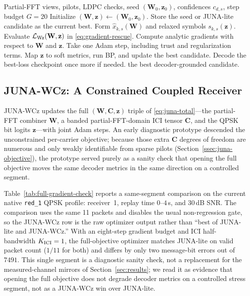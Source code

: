 \documentclass[journal]{IEEEtran}
\newcommand{\junalite}{JUNA-lite}
\newcommand{\junawz}{JUNA-Wz}
\newcommand{\junawcz}{JUNA-WCz}
\begin{document}
\begin{algorithm}[t]
\caption{\junawz{} robust reduced-gradient refinement}
\label{alg:junawz}
\footnotesize
\begin{algorithmic}[1]
\Require Partial-FFT views, pilots, LDPC checks, seed
  \((\mathbf W_0,\mathbf z_0)\), confidences \(c_{d,s}\), step budget \(G=20\)
\State Initialize \((\mathbf W,\mathbf z)\gets(\mathbf W_0,\mathbf z_0)\).
\State Store the seed or \junalite{} candidate as the current best.
  \State Form \(\widehat x_{k,s}(\mathbf W)\) and relaxed symbols
    \(s_{k,s}(\mathbf z)\).
  \State Evaluate \(\mathcal L_{\rm Wz}(\mathbf W,\mathbf z)\) in
    \eqref{eq:gradient-rescue}.
  \State Compute analytic gradients with respect to \(\mathbf W\) and
    \(\mathbf z\).
  \State Take one Adam step, including trust and regularization terms.
  \State Map \(\mathbf z\) to soft metrics, run BP, and update the best candidate.
\EndFor
\State Decode the best-loss checkpoint once more if needed.
\State \Return the best decoder-grounded candidate.
\end{algorithmic}
\end{algorithm}

\subsection{\texorpdfstring{\junawcz{}}{JUNA-WCz}: A Constrained Coupled
Receiver}\label{ssec:juna-wcz}
\junawcz{} updates the full $(\mathbf W,\mathbf C,\mathbf z)$ triple of
\eqref{eq:juna-total}---the partial-FFT combiner $\mathbf W$, a banded
partial-FFT-domain ICI tensor $\mathbf C$, and the QPSK bit logits $\mathbf z$---with
joint Adam steps. An early diagnostic prototype descended the unconstrained
per-carrier objective; because those extra $\mathbf C$ degrees of freedom are
numerous and only weakly identifiable from sparse pilots
(Section~\ref{ssec:juna-objective}), the prototype served purely as a sanity
check that opening the full objective moves the same decoder metrics in the same
direction on a controlled segment.

Table~\ref{tab:full-gradient-check} reports a same-segment comparison on the
current native \texttt{red\_1} QPSK profile: receiver~1, replay time
$0$--$4$\,s, and 30\,dB SNR. The comparison uses the same 11 packets and
disables the usual non-regression gate, so the \junawcz{} row is the raw
optimizer output rather than ``best of \junalite{} and \junawcz{}.'' With an
eight-step gradient budget and ICI half-bandwidth
$K_{\rm ICI}=1$, the full-objective optimizer matches \junalite{} on valid
packet count ($1/11$ for both) and differs by only two message-bit errors out of
$7491$. This single segment is a diagnostic sanity check, not a replacement for
the measured-channel mirrors of Section~\ref{sec:results}; we read it as
evidence that opening the full objective does not degrade decoder metrics on a
controlled stress segment, not as a \junawcz{} win over \junalite{}.
\end{document}
